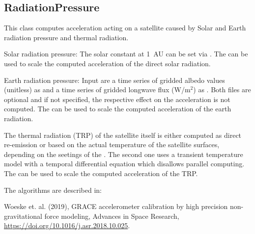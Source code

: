 \subsection{RadiationPressure}\label{miscAccelerationsType:RadiationPressure}
This class computes acceleration acting on a satellite caused by Solar and Earth radiation pressure
and thermal radiation.

Solar radiation pressure: The solar constant at 1~AU can be set via .
The  can be used to scale the computed acceleration of the direct solar radiation.

Earth radiation pressure:
Input are a time series of gridded albedo values (unitless) as 
and a time series of gridded longwave flux (W/m$^2$) as .
Both files are optional and if not specified, the respective effect on the acceleration is not computed.
The  can be used to scale the computed acceleration of the earth radiation.

The thermal radiation (TRP) of the satellite itself is either computed as direct re-emission or
based on the actual temperature of the satellite surfaces, depending on the seetings of the
. The second one uses a transient temperature model
with a temporal differential equation which disallows parallel computing.
The  can be used to scale the computed acceleration of the TRP.

The algorithms are described in:

Woeske et. al. (2019), GRACE accelerometer calibration by high precision non-gravitational force modeling,
Advances in Space Research, \url{https://doi.org/10.1016/j.asr.2018.10.025}.


